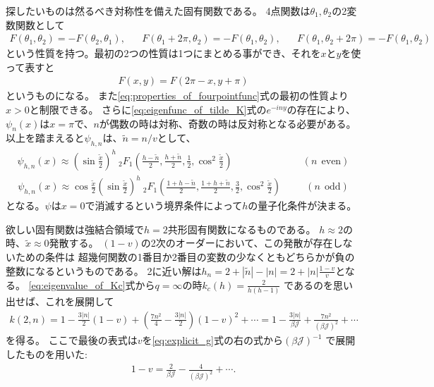 探したいものは然るべき対称性を備えた固有関数である。
4点関数は$\theta_1, \theta_2$の2変数関数として
\begin{align}
	F(\theta_1, \theta_2) = -F(\theta_2, \theta_1),\hspace{20pt}
	F(\theta_1 + 2\pi, \theta_2) = -F(\theta_1, \theta_2),\hspace{20pt}
	F(\theta_1, \theta_2 + 2\pi) = -F(\theta_1, \theta_2)
	\label{eq:properties_of_fourpointfunc}
\end{align}
という性質を持つ。最初の2つの性質は1つにまとめる事ができ、それを$x$と$y$を使って表すと
\begin{align}
	F(x, y) = F(2\pi - x, y + \pi)
\end{align}
というものになる。
また\eqref{eq:properties_of_fourpointfunc}式の最初の性質より$x > 0$と制限できる。
さらに\eqref{eq:eigenfunc_of_tilde_K}式の$e^{-iny}$の存在により、
$\psi_n(x)$は$x=\pi$で、$n$が偶数の時は対称、奇数の時は反対称となる必要がある。
以上を踏まえると$\psi_{h,n}$は、$\tilde{n} = n/v$として、
\begin{align}
	\psi_{h,n}(x)
	\approx \left(\sin\frac{\tilde{x}}{2}\right)^h\ 
	{}_2F_1\left(
		\frac{h-\tilde{n}}{2}, \frac{h+\tilde{n}}{2},
		\frac{1}{2},\cos^2\frac{\tilde{x}}{2}
		\right)\hspace{85pt}(n\ \ \mathrm{even})
	\label{eq:psi_hn_for_even}
\end{align}
\begin{align}
	\psi_{h,n}(x)
	\approx \cos\frac{\tilde{x}}{2}\left(\sin\frac{\tilde{x}}{2}\right)^h\ 
		{}_2F_1\left(
			\frac{1 + h - \tilde{n}}{2},
			\frac{1 + h + \tilde{n}}{2},
			\frac{3}{2},
			\cos^2\frac{\tilde{x}}{2}
		\right)\hspace{30pt}(n\ \ \mathrm{odd})
	\label{eq:psi_hn_for_odd}
\end{align}
となる。$\psi$は$x=0$で消滅するという境界条件によって$h$の量子化条件が決まる。

欲しい固有関数は強結合領域で$h=2$共形固有関数になるものである。
$h\approx 2$の時、$\tilde{x}\approx 0$発散する。
$(1-v)$の2次のオーダーにおいて、この発散が存在しないための条件は
超幾何関数の1番目か2番目の変数の少なくともどちらかが負の整数になるというものである。
2に近い解は$h_n = 2 + |\tilde{n}| - |n| = 2 + |n|\frac{1-v}{v}$となる。
\eqref{eq:eigenvalue_of_Kc}式から$q = \infty$の時$k_c(h) = \frac{2}{h(h-1)}$
であるのを思い出せば、これを展開して
\begin{align}
	k(2, n)
	= 1 - \frac{3|n|}{2}(1 - v) + \left(\frac{7n^2}{4} - \frac{3|n|}{2}\right)(1 - v)^2
		+ \cdots
	= 1 - \frac{3|n|}{\beta \mathcal{J}} + \frac{7n^2}{(\beta \mathcal{J})^2} + \cdots
	\label{eq:eigenvalue_at_large_q}
\end{align}
を得る。
ここで最後の表式は$v$を\eqref{eq:explicit_g}式の右の式から$(\beta \mathcal{J})^{-1}$
で展開したものを用いた:
\begin{align}
	1 - v = \frac{2}{\beta\mathcal{J}} - \frac{4}{(\beta\mathcal{J})^2} + \cdots.
\end{align}

